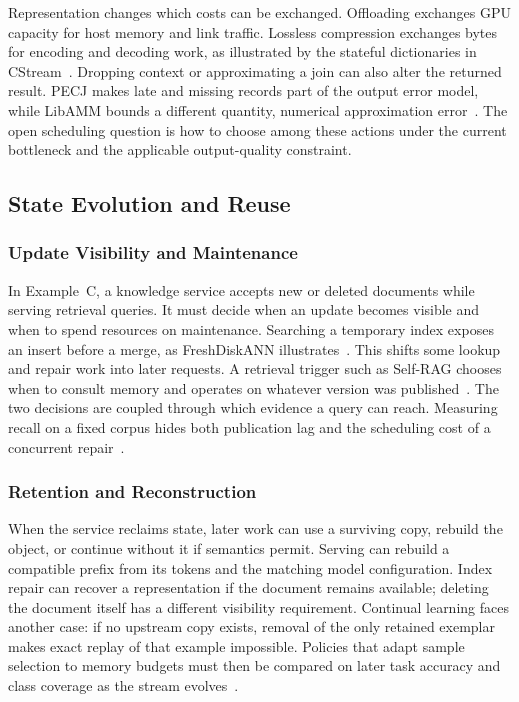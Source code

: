 \documentclass[manuscript]{acmart}
\begin{document}
Representation changes which costs can be exchanged. Offloading exchanges GPU capacity for host memory and link traffic. Lossless compression exchanges bytes for encoding and decoding work, as illustrated by the stateful dictionaries in CStream~\cite{zeng2023cstreamicde,zeng2024cstream}. Dropping context or approximating a join can also alter the returned result. PECJ makes late and missing records part of the output error model, while LibAMM bounds a different quantity, numerical approximation error~\cite{zeng2024pecj,zeng2024libamm}. The open scheduling question is how to choose among these actions under the current bottleneck and the applicable output-quality constraint.

\subsection{State Evolution and Reuse}

\subsubsection{Update Visibility and Maintenance}

In Example~C, a knowledge service accepts new or deleted documents while serving retrieval queries. It must decide when an update becomes visible and when to spend resources on maintenance. Searching a temporary index exposes an insert before a merge, as FreshDiskANN illustrates~\cite{singh2021freshdiskann}. This shifts some lookup and repair work into later requests. A retrieval trigger such as Self-RAG chooses when to consult memory and operates on whatever version was published~\cite{asai2024selfrag}. The two decisions are coupled through which evidence a query can reach. Measuring recall on a fixed corpus hides both publication lag and the scheduling cost of a concurrent repair~\cite{wang2026candor}.

\subsubsection{Retention and Reconstruction}

When the service reclaims state, later work can use a surviving copy, rebuild the object, or continue without it if semantics permit. Serving can rebuild a compatible prefix from its tokens and the matching model configuration. Index repair can recover a representation if the document remains available; deleting the document itself has a different visibility requirement. Continual learning faces another case: if no upstream copy exists, removal of the only retained exemplar makes exact replay of that example impossible. Policies that adapt sample selection to memory budgets must then be compared on later task accuracy and class coverage as the stream evolves~\cite{zhou2025ferret,li2026streamfp}.
\end{document}
